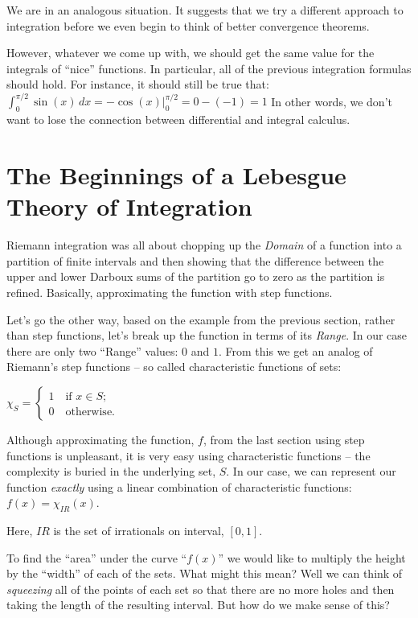 \documentclass{article}
\begin{document}
We are in an analogous situation. It suggests that 
we try a different approach to integration before we even
begin to think of better convergence theorems. 

However, whatever we come up with, we should get the same value for the 
integrals of ``nice'' functions. In particular, all of the previous integration 
formulas should hold. For instance, it should still be true that: 
$\int_0^{\pi / 2} \sin(x) \, dx = -\cos(x)|_{0}^{\pi / 2} = 0 - (-1) = 1$
In other words, we don't want to lose the connection between differential and
integral calculus.


\section{The Beginnings of a Lebesgue Theory of Integration}

Riemann integration was all about chopping up the {\em Domain\/} of a function 
into a partition of finite intervals and then showing that the difference 
between the upper and lower Darboux sums of the partition 
go to zero as the partition is refined. Basically, approximating the function 
with step functions.

Let's go the other way, based on the example from the previous section, rather 
than step functions, let's break up the function in terms of its {\em Range\/}. 
In our case there are only two ``Range'' values: $0$ and $1$. From this we get an 
analog of Riemann's step functions -- 
so called characteristic functions of sets:

$\chi_{S} = \begin{cases} 1 \quad \text{if $x \in  S$;} \\ 0 \quad \text{otherwise.} \end{cases}$

Although approximating the function, $f$, from the last section using step 
functions is unpleasant, it is very easy using characteristic functions -- the complexity 
is buried in the underlying set, $S$. In our case, we can represent our function {\em exactly\/}
using a linear combination of characteristic functions: $f(x) = \chi_{IR}(x)$.

Here, $IR$ is the set of irrationals on interval, $[0, 1]$.

To find the ``area'' under the curve ``$f(x)$'' we would like to multiply the 
height by the ``width'' of each of the sets. What might this mean?
Well we can think of {\em squeezing\/} all of the points of each set so that there are 
no more holes and then taking the length of the resulting interval.
But how do we make sense of this?
\end{document}
